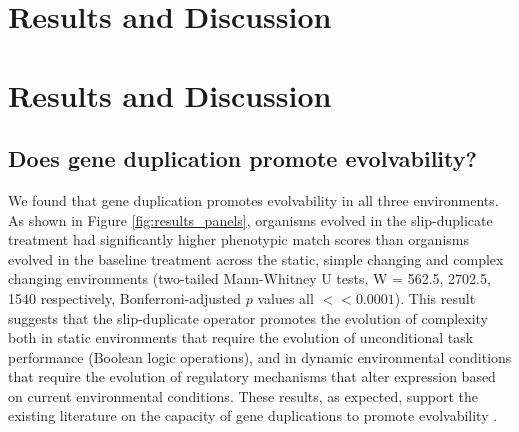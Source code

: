 \section{Results and Discussion} \label{sec:results}





\section{Results and Discussion}
%
%
%
%

\subsection{Does gene duplication promote evolvability?}
We found that gene duplication promotes evolvability in all three environments. As shown in Figure \ref{fig:results_panels}, organisms evolved in the slip-duplicate treatment had significantly higher phenotypic match scores than organisms evolved in the baseline treatment across the static, simple changing and complex changing environments (two-tailed Mann-Whitney U tests, W = 562.5, 2702.5, 1540 respectively, Bonferroni-adjusted $p$ values all $<< 0.0001$). This result suggests that the slip-duplicate operator promotes the evolution of complexity
both in static environments that require the evolution %
of unconditional task performance (Boolean logic operations), and in dynamic environmental conditions that require the evolution of regulatory mechanisms that alter expression based on current environmental conditions.
These results, as expected, support the existing literature on the capacity of gene duplications to promote evolvability %
\citep{Koza:1995fr,Zhang:2003fw,Teichmann:2004cz}. %

